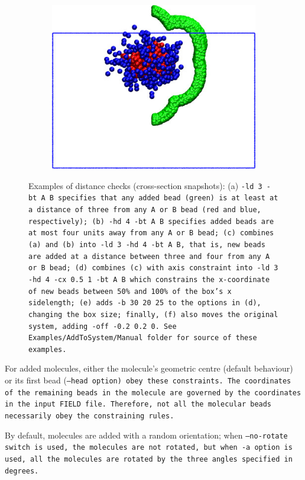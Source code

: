 \begin{figure}[b]
\begin{subfigure}{0.20\textwidth}
    \includegraphics[width=1.0\textwidth]{AddToSystem-A-ld_hd_cx_b_off.jpg}
    \caption{}
  \end{subfigure}
  \caption{
    Examples of distance checks (cross-section snapshots): (a) \tt{-ld 3 -bt A
    B} specifies that any added bead (green) is at least at a distance of three
    from any \tt{A} or \tt{B} bead (red and blue, respectively); (b) \tt{-hd 4
    -bt A B} specifies added beads are at most four units away from any \tt{A}
    or \tt{B} bead; (c) combines (a) and (b) into \tt{-ld 3 -hd 4 -bt A B}, that
    is, new beads are added at a distance between three and four from any \tt{A}
    or \tt{B} bead; (d) combines (c) with axis constraint into \tt{-ld 3 -hd 4
    -cx 0.5 1 -bt A B} which constrains the x-coordinate of new beads between
    50\% and 100\% of the box's x sidelength; (e) adds \tt{-b 30 20 25} to the
    options in (d), changing the box size; finally, (f) also moves the original
    system, adding \tt{-off -0.2 0.2 0}. See \tt{Examples/AddToSystem/Manual}
    folder for source of these examples.
  }\label{fig:AddToSystem}
\end{figure}

For added molecules, either the molecule's geometric centre (default behaviour)
or its first bead (\tt{--head} option) obey these constraints. The coordinates
of the remaining beads in the molecule are governed by the coordinates in the
input \tt{FIELD} file. Therefore, not all the molecular beads necessarily obey
the constraining rules.

By default, molecules are added with a random orientation; when \tt{--no-rotate}
switch is used, the molecules are not rotated, but when \tt{-a} option is used,
all the molecules are rotated by the three angles specified in degrees.


